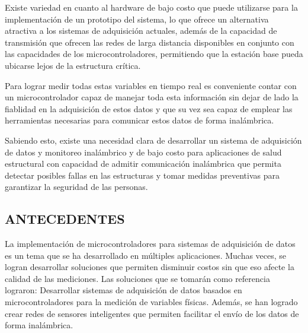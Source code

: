 \documentclass[12pt,letterpaper]{article}
\begin{document}
Existe variedad en cuanto al hardware de bajo costo que puede utilizarse para la implementación de un prototipo del sistema, lo que ofrece un alternativa atractiva a los sistemas de adquisición actuales, además de la capacidad de transmisión que ofrecen las redes de larga distancia disponibles en conjunto con las capacidades de los microcontroladores, permitiendo que la estación base pueda ubicarse lejos de la estructura crítica.

Para lograr medir todas estas variables en tiempo real es conveniente contar con un microcontrolador capaz de manejar toda esta información sin dejar de lado la fiablidad en la adquisición de estos datos y que su vez sea capaz de emplear las herramientas necesarias para comunicar estos datos de forma inalámbrica.

Sabiendo esto, existe una necesidad clara de desarrollar un sistema de adquisición de datos y monitoreo inalámbrico y de bajo costo para aplicaciones de salud estructural con capacidad de admitir comunicación inalámbrica que permita detectar posibles fallas en las estructuras y tomar medidas preventivas para garantizar la seguridad de las personas.


\newpage


\begin{center}
	\section*{ANTECEDENTES}
\end{center}

\vspace{1cm}

La implementación de microcontroladores para sistemas de adquisición de datos es un tema que se ha desarrollado en múltiples aplicaciones. Muchas veces, se logran desarrollar soluciones que permiten disminuir costos sin que eso afecte la calidad de las mediciones. Las soluciones que se tomarán como referencia lograron: Desarrollar sistemas de adquisición de datos basados en microcontroladores para la medición de variables físicas. Además, se han logrado crear redes de sensores inteligentes que permiten facilitar el envío de los datos de forma inalámbrica.

\end{document}
